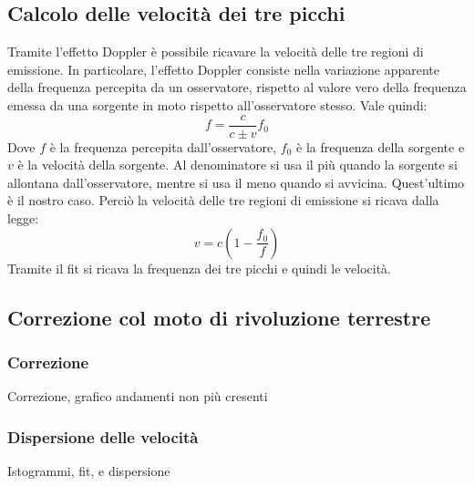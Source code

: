 \subsection{Calcolo delle velocità dei tre picchi}
Tramite l'effetto Doppler è possibile ricavare la velocità delle tre regioni di emissione. In particolare, l'effetto Doppler consiste nella variazione apparente della frequenza percepita da un osservatore, rispetto al valore vero della frequenza emessa da una sorgente in moto rispetto all'osservatore stesso. Vale quindi:
\begin{equation}
    f=\frac{c}{c\pm v}f_{0}
\end{equation}
Dove $f$ è la frequenza percepita dall'osservatore, $f_{0}$ è la frequenza della sorgente e $v$ è la velocità della sorgente. Al denominatore si usa il più quando la sorgente si allontana dall'osservatore, mentre si usa il meno quando si avvicina. Quest'ultimo è il nostro caso. Perciò la velocità delle tre regioni di emissione si ricava dalla legge:
\begin{equation}
    v=c (1-\frac{f_{0}}{f})
\end{equation}
Tramite il fit si ricava la frequenza dei tre picchi e quindi le velocità.

\subsection{Correzione col moto di rivoluzione terrestre}

\subsubsection{Correzione}
Correzione, grafico andamenti non più cresenti 


\subsubsection{Dispersione delle velocità}
Istogrammi, fit, e dispersione